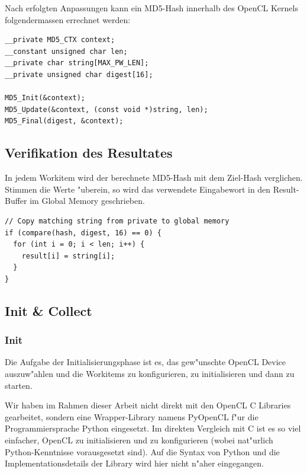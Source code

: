 \begin{refsection}
Nach erfolgten Anpassungen kann ein MD5-Hash innerhalb des OpenCL Kernels
folgendermassen errechnet werden:

\begin{small}
\begin{verbatim}
__private MD5_CTX context;
__constant unsigned char len;
__private char string[MAX_PW_LEN];
__private unsigned char digest[16];

MD5_Init(&context);
MD5_Update(&context, (const void *)string, len);
MD5_Final(digest, &context);
\end{verbatim}
\end{small}

\subsection{Verifikation des Resultates}
\label{crypto:verifikation}

In jedem Workitem wird der berechnete MD5-Hash mit dem Ziel-Hash verglichen.
Stimmen die Werte "uberein, so wird das verwendete Eingabewort in den
Result-Buffer im Global Memory geschrieben.

\begin{small}
\begin{verbatim}
// Copy matching string from private to global memory
if (compare(hash, digest, 16) == 0) {
  for (int i = 0; i < len; i++) {
    result[i] = string[i];
  }
}
\end{verbatim}
\end{small}

\subsection{Init \& Collect}

\subsubsection{Init}

Die Aufgabe der Initialisierungsphase ist es, das gew"unschte OpenCL Device
auszuw"ahlen und die Workitems zu konfigurieren, zu initialisieren und dann zu
starten.

Wir haben im Rahmen dieser Arbeit nicht direkt mit den OpenCL C Libraries
gearbeitet, sondern eine Wrapper-Library namens
PyOpenCL\cite{crypto:pyopencl_docs} f"ur die Programmiersprache
Python\cite{crypto:python} eingesetzt. Im direkten Vergleich mit C ist es so viel
einfacher, OpenCL zu initialisieren und zu konfigurieren (wobei nat"urlich
Python-Kenntnisse vorausgesetzt sind). Auf die Syntax von Python und die
Implementationsdetails der Library wird hier nicht n"aher eingegangen.


\end{refsection}
